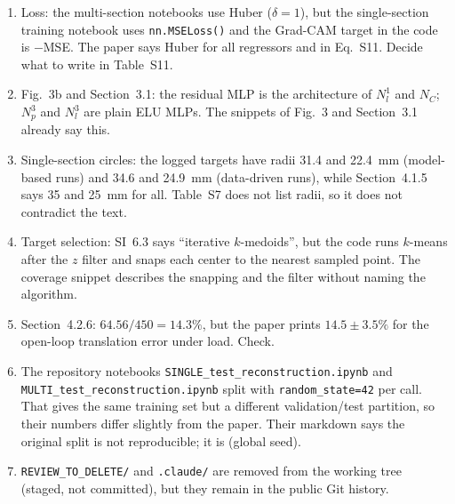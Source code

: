 \documentclass[10pt,a4paper]{article}
\begin{document}
\begin{priv}
\begin{enumerate}
\item \label{priv:loss}Loss: the multi-section notebooks use Huber ($\delta=1$), but the single-section training notebook uses \texttt{nn.MSELoss()} and the Grad-CAM target in the code is $-$MSE. The paper says Huber for all regressors and in Eq.~S11. Decide what to write in Table~S11.
\item Fig.~3b and Section~3.1: the residual MLP is the architecture of $N_l^1$ and $N_C$; $N_p^3$ and $N_l^3$ are plain ELU MLPs. The snippets of Fig.~3 and Section~3.1 already say this.
\item Single-section circles: the logged targets have radii 31.4 and 22.4~mm (model-based runs) and 34.6 and 24.9~mm (data-driven runs), while Section~4.1.5 says 35 and 25~mm for all. Table~S7 does not list radii, so it does not contradict the text.
\item Target selection: SI~6.3 says ``iterative $k$-medoids'', but the code runs $k$-means after the $z$ filter and snaps each center to the nearest sampled point. The coverage snippet describes the snapping and the filter without naming the algorithm.
\item Section~4.2.6: $64.56/450 = 14.3\%$, but the paper prints $14.5 \pm 3.5\%$ for the open-loop translation error under load. Check.
\item The repository notebooks \texttt{SINGLE\_test\_reconstruction.ipynb} and \texttt{MULTI\_test\_reconstruction.ipynb} split with \texttt{random\_state=42} per call. That gives the same training set but a different validation/test partition, so their numbers differ slightly from the paper. Their markdown says the original split is not reproducible; it is (global seed).
\item \texttt{REVIEW\_TO\_DELETE/} and \texttt{.claude/} are removed from the working tree (staged, not committed), but they remain in the public Git history.
\end{enumerate}
\end{priv}
\end{document}
